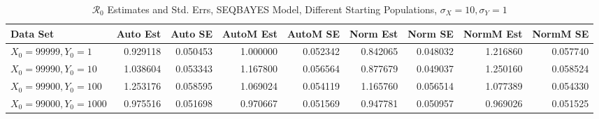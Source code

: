 \documentclass[12pt]{article}
\newcommand{\rr}{\ensuremath{\mathcal{R}_0}}
\begin{document}
\begin{table}[H]
	
	\caption{$\rr$ Estimates and Std. Errs, SEQBAYES Model,
		Different Starting Populations, 
		$\sigma_X = 10, \sigma_Y = 1$}
	\begin{footnotesize}
		\hskip -1.7cm
		\begin{tabular}{l|r|r|r|r|r|r|r|r}
			\hline
			Data Set & Auto Est & Auto SE & AutoM Est & AutoM SE & Norm Est & Norm SE & NormM Est & NormM SE\\
			\hline
			$X_0 = 99999, Y_0 = 1$ & 0.929118 & 0.050453 & 1.000000 & 0.052342 & 0.842065 & 0.048032 & 1.216860 & 0.057740\\
			\hline
			$X_0 = 99990, Y_0 = 10$ & 1.038604 & 0.053343 & 1.167800 & 0.056564 & 0.877679 & 0.049037 & 1.250160 & 0.058524\\
			\hline
			$X_0 = 99900, Y_0 = 100$ & 1.253176 & 0.058595 & 1.069024 & 0.054119 & 1.165760 & 0.056514 & 1.077389 & 0.054330\\
			\hline
			$X_0 = 99000, Y_0 = 1000$ & 0.975516 & 0.051698 & 0.970667 & 0.051569 & 0.947781 & 0.050957 & 0.969026 & 0.051525\\
			\hline
		\end{tabular}
	\end{footnotesize}
\end{table}
\end{document}
